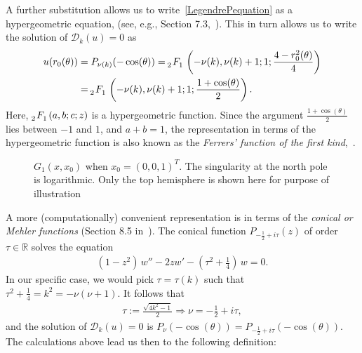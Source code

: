 A further substitution allows us to write~\eqref{LegendrePequation} as
a hypergeometric equation, (see, e.g., Section 7.3,~\cite{lebedev}).
This in turn allows us to write the solution of $\mathcal{D}_k(u)=0$ as 
\begin{align*} 
  u(r_0(\theta)) &= P_{\nu(k)}(-\cos(\theta)) = 
    \tensor[_2]{F}{_1}\left(-\nu(k), \nu(k)+  1; 1; 
      \frac{4-r_0^2(\theta)}{4}\right) \\
    &=\tensor[_2]{F}{_1}\left(-\nu(k), \nu(k)+  1; 1;
    \frac{1+\cos(\theta)}{2}\right).
\end{align*} 
Here, $\tensor[_2]{F}{_1}(a,b;c;z)$ is a hypergeometric function. Since
the argument $\frac{1+\cos(\theta)}{2}$ lies between $-1$ and $1$, and
$a+b = 1$, the representation in terms of the hypergeometric function is
also known as the {\it Ferrers' function of the first
kind},~\cite{fatAbramowitz}. 

\begin{figure}
  \centering
  
  \caption{\label{f:greensFun} $G_1(x,x_0)$ when $x_0=(0,0,1)^T$. The
  singularity at the north pole is logarithmic. Only the top hemisphere
  is shown here for purpose of illustration}
\end{figure}
A more (computationally) convenient representation is in terms of the
{\it conical or Mehler functions} (Section 8.5 in~\cite{lebedev}). The
conical function $P_{-\frac{1}{2}+ i \tau}(z)$ of order $\tau\in
\mathbb{R}$ solves the equation
\begin{align*}
  (1-z^2)\,w'' -2zw' - \left( \tau^2+\frac{1}{4}\right) \,w = 0.
\end{align*}
In our specific case, we would pick $\tau = \tau(k)$ such that
$\tau^2+\frac{1}{4}=k^2 = -\nu(\nu+1).$  It follows that 
\begin{align*}
  \tau:=\frac{\sqrt{4k^2-1}}{2} \Rightarrow  \nu= -\frac{1}{2}+i\tau, 
\end{align*}
and the solution of $\mathcal{D}_k(u)=0$ is $
  P_{\nu} (-\cos(\theta)) = P_{-\frac{1}{2} + i \tau} 
    (-\cos(\theta)).$
The calculations above lead us then to the following definition:

